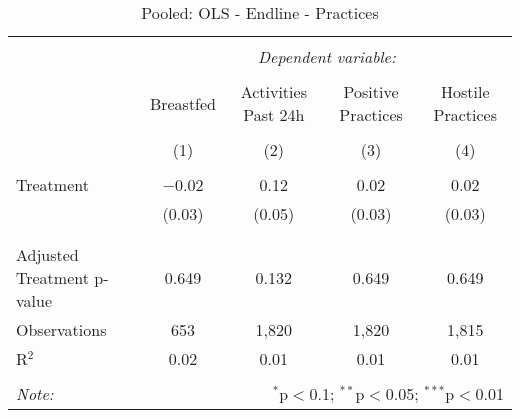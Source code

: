 
\begin{table}[!htbp] \centering 
  \caption{Pooled: OLS - Endline - Practices} 
  \label{tbl:Pooled: OLS - Endline - Practices} 
\begin{tabular}{@{\extracolsep{5pt}}lcccc} 
\\[-1.8ex]\hline 
\hline \\[-1.8ex] 
 & \multicolumn{4}{c}{\textit{Dependent variable:}} \\ 
\cline{2-5} 
\\[-1.8ex] & Breastfed & Activities Past 24h & Positive Practices & Hostile Practices \\ 
\\[-1.8ex] & (1) & (2) & (3) & (4)\\ 
\hline \\[-1.8ex] 
 Treatment & $-$0.02 & 0.12 & 0.02 & 0.02 \\ 
  & (0.03) & (0.05) & (0.03) & (0.03) \\ 
  & & & & \\ 
\hline \\[-1.8ex] 
Adjusted Treatment p-value & 0.649 & 0.132 & 0.649 & 0.649 \\ 
Observations & 653 & 1,820 & 1,820 & 1,815 \\ 
R$^{2}$ & 0.02 & 0.01 & 0.01 & 0.01 \\ 
\hline 
\hline \\[-1.8ex] 
\textit{Note:}  & \multicolumn{4}{r}{$^{*}$p$<$0.1; $^{**}$p$<$0.05; $^{***}$p$<$0.01} \\ 
\end{tabular} 
\end{table} 
